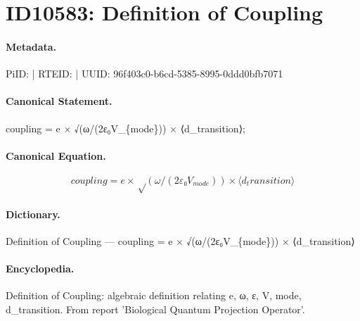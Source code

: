 \section*{ID10583: Definition of Coupling}
\paragraph{Metadata.}
PiID:  | RTEID:  | UUID: 96f403c0-b6cd-5385-8995-0ddd0bfb7071

\paragraph{Canonical Statement.}
coupling = e × √(ω/(2ε₀V\_\{mode\})) × ⟨d\_transition⟩;

\paragraph{Canonical Equation.}
\[
coupling = e × √(ω/(2ε₀V_{mode})) × ⟨d_transition⟩
\]

\paragraph{Dictionary.}
Definition of Coupling — coupling = e × √(ω/(2ε₀V\_\{mode\})) × ⟨d\_transition⟩

\paragraph{Encyclopedia.}
Definition of Coupling: algebraic definition relating e, ω, ε, V, mode, d\_transition. From report 'Biological Quantum Projection Operator'.
